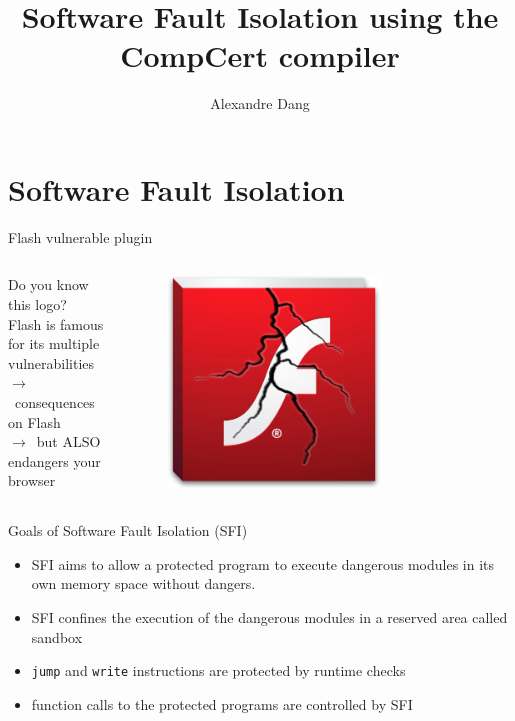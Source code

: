 \documentclass{beamer}
\title{Software Fault Isolation using the CompCert compiler}
\author{Alexandre Dang}
\institute{Team Celtique}
\begin{document}
\frame{\titlepage}
 

\section{Software Fault Isolation}
\label{sec:Software Fault Isolation}



\begin{frame}{Flash vulnerable plugin}
	\begin{columns}[onlytextwidth]
		\begin{column}{0.5\textwidth}
			Do you know this logo?\\
			\vspace{5mm}
			Flash is famous for its multiple vulnerabilities\\
			$\rightarrow$~consequences on Flash\\
			$\rightarrow$~but ALSO endangers your browser
		\end{column}
		\begin{column}{0.5\textwidth}
			\begin{figure}
				\centering
				\includegraphics[width=0.7\textwidth]{images/flash.jpg}
			\end{figure}
		\end{column}
	\end{columns}
\end{frame}


\begin{frame}{Goals of Software Fault Isolation (SFI)}
	\begin{itemize}
		\item SFI aims to allow a protected program to execute dangerous modules in its own memory space without dangers. 
		\item SFI confines the execution of the dangerous modules in a reserved area called sandbox
		\item \texttt{jump} and \texttt{write} instructions are protected by runtime checks
		\item function calls to the protected programs are controlled by SFI
	\end{itemize}
\end{frame}
\end{document}
